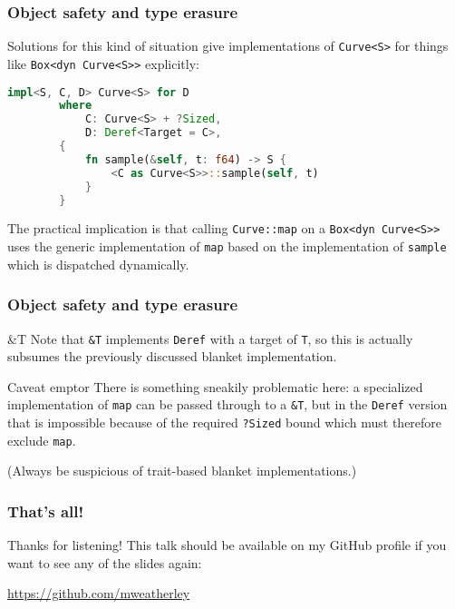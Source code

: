 \documentclass[10pt]{beamer}
\begin{document}
\begin{frame}[fragile]
    \frametitle{Object safety and type erasure}
    Solutions for this kind of situation give implementations of \texttt{Curve<S>} for things like \texttt{Box<dyn Curve<S>>} explicitly:
    \begin{lstlisting}[language=Rust, gobble=8]
        impl<S, C, D> Curve<S> for D
        where
            C: Curve<S> + ?Sized,
            D: Deref<Target = C>,
        {
            fn sample(&self, t: f64) -> S {
                <C as Curve<S>>::sample(self, t)
            }
        }
    \end{lstlisting}
    The practical implication is that calling \texttt{Curve::map} on a \texttt{Box<dyn Curve<S>>} uses the generic implementation of \texttt{map} based on the implementation of \texttt{sample} which is dispatched dynamically. 
\end{frame}

\begin{frame}[fragile]
    \frametitle{Object safety and type erasure}
    \begin{block}{\&T}
        Note that \texttt{\&T} implements \texttt{Deref} with a target of \texttt{T}, so this is actually subsumes the previously discussed blanket implementation.
    \end{block}\pause
    \begin{alertblock}{Caveat emptor}
        There is something sneakily problematic here: a specialized implementation of \texttt{map} can be passed through to a \texttt{\&T}, but in the \texttt{Deref} version that is impossible because of the required \verb|?Sized| bound which must therefore exclude \texttt{map}.
    \end{alertblock}\pause
(Always be suspicious of trait-based blanket implementations.)
\end{frame}

\begin{frame}
    \frametitle{That's all!}
    Thanks for listening! This talk should be available on my GitHub profile if you want to see any of the slides again:
    
    
    \url{https://github.com/mweatherley}
\end{frame}
\end{document}
